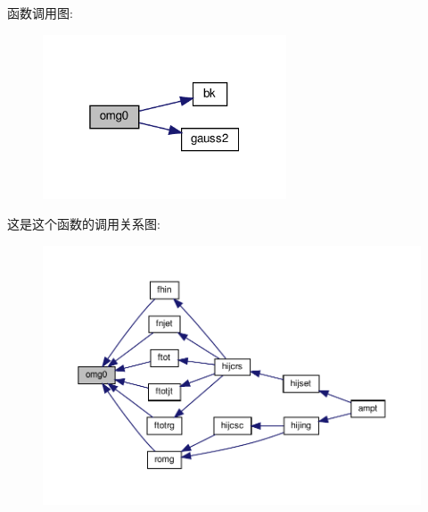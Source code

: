 函数调用图\+:
\nopagebreak
\begin{figure}[H]
\begin{center}
\leavevmode
\includegraphics[width=205pt]{omg0_8f90_a73a708f3a1db477b8602c2d290d25080_cgraph}
\end{center}
\end{figure}
这是这个函数的调用关系图\+:
\nopagebreak
\begin{figure}[H]
\begin{center}
\leavevmode
\includegraphics[width=350pt]{omg0_8f90_a73a708f3a1db477b8602c2d290d25080_icgraph}
\end{center}
\end{figure}
